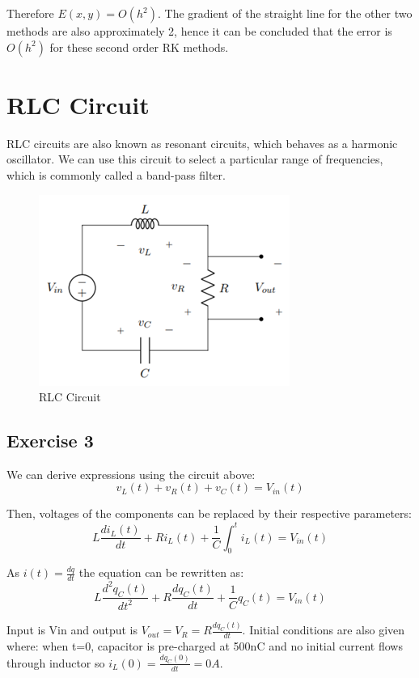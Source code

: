 \documentclass[11pt, oneside, titlepage]{article}   	%
\begin{document}
Therefore $E(x,y)=O(h^2)$. The gradient of the straight line for the other two methods are also approximately 2, hence it can be concluded that the error is $O(h^2)$ for these second order RK methods.


\section{RLC Circuit}
RLC circuits are also known as resonant circuits, which behaves as a harmonic oscillator. We can use this circuit to select a particular range of frequencies, which is commonly called a band-pass filter.

\begin{figure}[H]
\center
\includegraphics[scale = 0.5]{exercise3_1}
\caption{RLC Circuit} \label{fig:ex3_1}
\end{figure}

\subsection{Exercise 3}
We can derive expressions using the circuit above:
\begin{equation}
v_L(t)+v_R(t)+v_C(t)=V_{in}(t)
\end{equation}

Then, voltages of the components can be replaced by their respective parameters:
\begin{equation}
L\frac{di_L(t)}{dt}+Ri_L(t)+\frac{1}{C}\int_0^t{i_L(t)}=V_{in}(t)
\end{equation}

As $i(t)=\frac{dq}{dt}$ the equation can be rewritten as:
\begin{equation}
L\frac{d^2q_C(t)}{dt^2}+R\frac{dq_C(t)}{dt}+\frac{1}{C}q_C(t)=V_{in}(t)
\end{equation}

Input is Vin and output is $V_{out}=V_R=R\frac{dq_C(t)}{dt}$. Initial conditions are also given where: when t=0, capacitor is pre-charged at 500nC and no initial current flows through inductor so $i_L(0)=\frac{dq_C(0)}{dt}=0A$.
\end{document}
